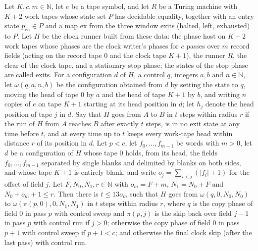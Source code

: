\begin{lemma}
\label{Turing.cw_pass_rewind}
\leanok
{}
Let $K,c,m\in\mathbb{N}$, let $e$ be a tape symbol, and let $R$ be a Turing machine with $K+2$
work tapes whose state set $P$ has decidable equality, together with an entry state
$p_{\mathrm{en}}\in P$ and a map $\mathrm{ex}$ from the three window exits (halted, left,
exhausted) to $P$. Let $H$ be the clock runner built from these data: the phase host on $K+2$
work tapes whose phases are the clock writer's phases for $c$ passes over $m$ record fields
(acting on the record tape $0$ and the clock tape $K+1$), the runner $R$, the clear of the
clock tape, and a stationary stop phase; the states of the stop phase are called exits. For a
configuration $d$ of $H$, a control $q$, integers $a,b$ and $n\in\mathbb{N}$, let
$\omega(q,a,n,b)$ be the configuration obtained from $d$ by setting the state to $q$, moving
the head of tape $0$ by $a$ and the head of tape $K+1$ by $b$, and writing $n$ copies of $e$ on
tape $K+1$ starting at its head position in $d$; let $h_j$ denote the head position of tape $j$
in $d$. Say that $H$ goes from $A$ to $B$ in $t$ steps within radius $r$ if the run of $H$ from
$A$ reaches $B$ after exactly $t$ steps, is in no exit state at any time before $t$, and at
every time up to $t$ keeps every work-tape head within distance $r$ of its position in $d$. Let
$p<c$, let $f_0,\dots,f_{m-1}$ be words with $m>0$, let $d$ be a configuration of $H$ whose
tape $0$ holds, from its head, the fields $f_0,\dots,f_{m-1}$ separated by single blanks and
delimited by blanks on both sides, and whose tape $K+1$ is entirely blank, and write
$o_j=\sum_{i<j}(|f_i|+1)$ for the offset of field $j$. Let $F,N_0,N_1,r\in\mathbb{N}$ with
$o_m=F+m$, $N_1=N_0+F$ and $N_0+o_m+1\le r$. Then there is $t\le 13o_m$ such that $H$ goes from
$\omega(q,0,N_0,N_0)$ to $\omega(\pi(p,0),0,N_1,N_1)$ in $t$ steps within radius $r$, where $q$
is the copy phase of field $0$ in pass $p$ with control sweep and $\pi(p,j)$ is the skip back
over field $j-1$ in pass $p$ with control run if $j>0$; otherwise the copy phase of field $0$
in pass $p+1$ with control sweep if $p+1<c$; and otherwise the final clock skip (after the last
pass) with control run.
\end{lemma}

